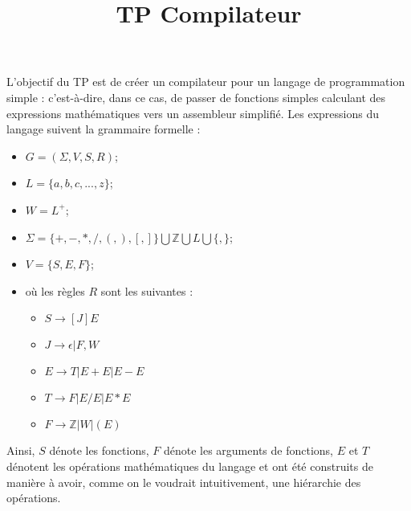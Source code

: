 \documentclass[12pt,letterpaper,onecolumn]{exam}
\title{TP Compilateur}
\date{}
\begin{document}
\maketitle

L'objectif du TP est de créer un compilateur pour un langage de programmation simple : c'est-à-dire, dans ce cas, de passer de fonctions simples calculant des expressions mathématiques vers un assembleur simplifié. Les expressions du langage suivent la grammaire formelle :
\begin{itemize}
    \item $G=(\Sigma, V, S, R)$;
    \item $L=\{a,b,c,...,z\}$;
    \item $W=L^+$;
    \item $\Sigma=\{+,-,*,/,(,),[,]\}\bigcup \mathbb{Z}\bigcup L\bigcup\{,\}$;
    \item $V=\{S, E, F\}$;
    \item où les règles $R$ sont les suivantes :
    \begin{itemize}
        \item $S \rightarrow [ J ] E$
        \item $J \rightarrow \epsilon | F, W$
        \item $E \rightarrow T | E + E | E - E$
        \item $T \rightarrow F | E / E | E * E$
        \item $F \rightarrow \mathbb{Z} | W | (E)$
    \end{itemize}
\end{itemize}
Ainsi, $S$ dénote les fonctions, $F$ dénote les arguments de fonctions, $E$ et $T$ dénotent les opérations mathématiques du langage et ont été construits de manière à avoir, comme on le voudrait intuitivement, une hiérarchie des opérations.
\end{document}
